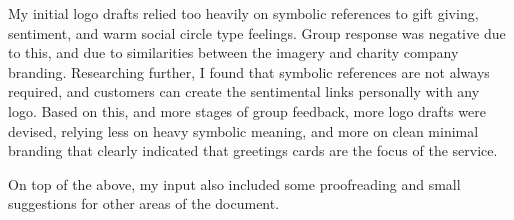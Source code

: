 \documentclass[10pt,a4paper]{article}
\begin{document}
\begin{appendices}
My initial logo drafts relied too heavily on symbolic references to gift giving, sentiment, and warm social circle type feelings. Group response was negative due to this, and due to similarities between the imagery and charity company branding. Researching further, I found that symbolic references are not always required, and customers can create the sentimental links personally with any logo. Based on this, and more stages of group feedback, more logo drafts were devised, relying less on heavy symbolic meaning, and more on clean minimal branding that clearly indicated that greetings cards are the focus of the service.

On top of the above, my input also included some proofreading and small suggestions for other areas of the document.



\end{appendices}
\end{document}
